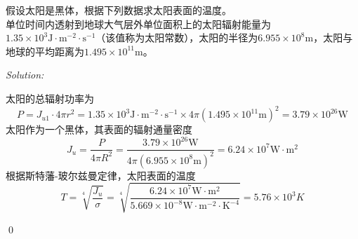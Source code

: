 \documentclass[12pt,a4paper]{article}
\newenvironment{problem}[2][Problem]{\begin{trivlist}
\item[\hskip \labelsep {\bfseries #1}\hskip \labelsep {\bfseries #2.}]}{\end{trivlist}}
\newenvironment{sol}
    {\emph{Solution:}
    }
    {
    \qed
    }
\begin{document}
\begin{problem}{2.14}
假设太阳是黑体，根据下列数据求太阳表面的温度。\\
单位时间内透射到地球大气层外单位面积上的太阳辐射能量为$1.35\times10^3\text{J}\cdot\text{m}^{-2}\cdot\text{s}^{-1}$（该值称为太阳常数），太阳的半径为$6.955\times10^8$m，太阳与地球的平均距离为$1.495\times10^{11}$m。
\end{problem}
\begin{sol}
太阳的总辐射功率为
\begin{equation}
P=J_{u1}\cdot4\pi r^2=1.35\times10^3\text{J}\cdot\text{m}^{-2}\cdot\text{s}^{-1}\times4\pi(1.495\times10^{11}\text{m})^2=3.79\times10^{26}\text{W}
\end{equation}
太阳作为一个黑体，其表面的辐射通量密度
\begin{equation}
J_u=\frac{P}{4\pi R^2}=\frac{3.79\times10^{26}\text{W}}{4\pi(6.955\times10^8\text{m})^2}=6.24\times10^7\text{W}\cdot\text{m}^2
\end{equation}
根据斯特藩-玻尔兹曼定律，太阳表面的温度
\begin{equation}
T=\sqrt[4]{\frac{J_u}{\sigma}}=\sqrt[4]{\frac{6.24\times10^7\text{W}\cdot\text{m}^2}{5.669\times10^{-8}\text{W}\cdot\text{m}^{-2}\cdot\text{K}^{-4}}}=5.76\times10^3K
\end{equation}
\end{sol}
\end{document}
